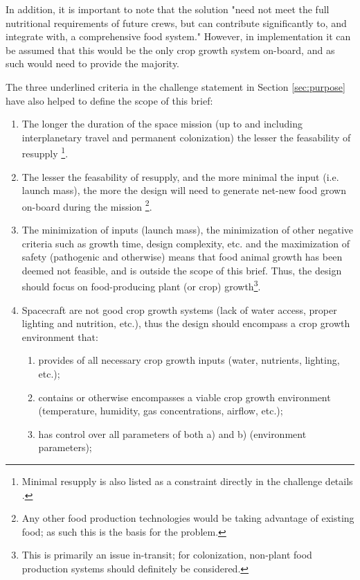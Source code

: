 \documentclass{report}
\begin{document}
In addition, it is important to note that the solution "need not meet the full nutritional requirements of 
future crews, but can contribute significantly to, and integrate with, a comprehensive food system." \cite{applicantguide} 
However, in implementation it can be assumed that this would be the only crop growth system on-board, and as such would
need to provide the majority.

The three underlined criteria in the challenge statement in Section \ref{sec:purpose} have also helped to define the 
scope of this brief:

\begin{enumerate}
\item The longer the duration of the space mission (up to and including interplanetary 
    travel and permanent colonization) the lesser the feasability of resupply
    \footnote{Minimal resupply is also listed as a constraint directly in the challenge 
    details \cite{applicantguide}.}.
\item The lesser the feasability of resupply, and the more minimal the input 
    (i.e. launch mass), the more the design will need to generate net-new food 
    grown on-board during the mission \footnote{Any other food production technologies 
    would be taking advantage of existing food; as such this is the basis for the 
    problem.}.
\item The minimization of inputs (launch mass), the minimization of other negative 
    criteria such as growth time, design complexity, etc. and the maximization of 
    safety (pathogenic and otherwise) means that food animal growth has been deemed 
    not feasible, and is outside the scope of this brief. Thus, the design should 
    focus on food-producing plant (or crop) growth\footnote{This is primarily an 
    issue in-transit; for colonization, non-plant food production systems should 
    definitely be considered.}.
\item Spacecraft are not good crop growth systems (lack of water access, proper 
    lighting and nutrition, etc.), thus the design should encompass a crop growth 
    environment that:
    \begin{enumerate}
        \item provides of all necessary crop growth inputs (water, nutrients, lighting, 
        etc.);
        \item contains or otherwise encompasses a viable crop growth environment 
        (temperature, humidity, gas concentrations, airflow, etc.);
        \item has control over all parameters of both a) and b) (environment parameters); 

\end{enumerate}
\end{enumerate}
\end{document}
